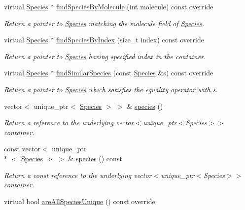 \begin{DoxyCompactItemize}
virtual \hyperlink{classSpecies}{Species} $\ast$ \hyperlink{classSpeciesPtrContainerVector_a327d4f5fcab1f34f2800bcd9fc329847}{find\+Species\+By\+Molecule} (int molecule) const override
\begin{DoxyCompactList}\small\item\em Return a pointer to \hyperlink{classSpecies}{Species} matching the molecule field of \hyperlink{classSpecies}{Species}. \end{DoxyCompactList}\item 
virtual \hyperlink{classSpecies}{Species} $\ast$ \hyperlink{classSpeciesPtrContainerVector_a3939b7cb8f19d90b1bf3ae55fd472cee}{find\+Species\+By\+Index} (size\+\_\+t index) const override
\begin{DoxyCompactList}\small\item\em Return a pointer to \hyperlink{classSpecies}{Species} having specified index in the container. \end{DoxyCompactList}\item 
virtual \hyperlink{classSpecies}{Species} $\ast$ \hyperlink{classSpeciesPtrContainerVector_a063a3aca60583beb76f4837868381446}{find\+Similar\+Species} (const \hyperlink{classSpecies}{Species} \&s) const override
\begin{DoxyCompactList}\small\item\em Return a pointer to \hyperlink{classSpecies}{Species} which satisfies the equality operator with s. \end{DoxyCompactList}\item 
vector$<$ unique\+\_\+ptr$<$ \hyperlink{classSpecies}{Species} $>$ $>$ \& \hyperlink{classSpeciesPtrContainerVector_a9ce8b3b4f9a170def9d758d4286e0d3e}{species} ()
\begin{DoxyCompactList}\small\item\em Return a reference to the underlying vector$<$unique\+\_\+ptr$<$\+Species$>$$>$ container. \end{DoxyCompactList}\item 
const vector$<$ unique\+\_\+ptr\\*
$<$ \hyperlink{classSpecies}{Species} $>$ $>$ \& \hyperlink{classSpeciesPtrContainerVector_aba5b9c097ec36c733d4c320988afe0b6}{species} () const 
\begin{DoxyCompactList}\small\item\em Return a const reference to the underlying vector$<$unique\+\_\+ptr$<$\+Species$>$$>$ container. \end{DoxyCompactList}\item 
virtual bool \hyperlink{classSpeciesPtrContainerVector_a32ef3763c7cb54ef42058a18b3765382}{are\+All\+Species\+Unique} () const override

\end{DoxyCompactItemize}
